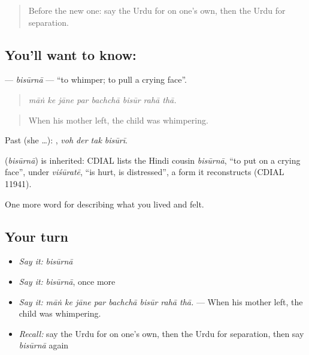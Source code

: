\label{lesson:UR-C450-bisurna}



\begin{quote}
Before the new one: say the Urdu for on one's own, then the Urdu for separation.
\end{quote}

\subsection*{You'll want to know: }
\textbf{} — \emph{bisūrnā} — \textquotedblleft{}to whimper; to pull a crying face\textquotedblright{}.

\begin{quote}
       
\end{quote}

\begin{quote}
\emph{māṅ ke jāne par bachchā bisūr rahā thā.}
\end{quote}

\begin{quote}
When his mother left, the child was whimpering.
\end{quote}

Past (she …):    , \emph{voh der tak bisūrī}.

\begin{cousinweb}
\textbf{} (\emph{bisūrnā}) is inherited: CDIAL lists the Hindi cousin \emph{bisūrnā}, \textquotedblleft{}to put on a crying face\textquotedblright{}, under \emph{viśūratē}, \textquotedblleft{}is hurt, is distressed\textquotedblright{}, a form it reconstructs (CDIAL 11941).
\end{cousinweb}

\begin{grammarlens}[title={What you've built}]
One more word for describing what you lived and felt.
\end{grammarlens}

\subsection*{Your turn}
\begin{itemize}
\raggedright
  \item \emph{Say it:} \emph{bisūrnā}
  \item \emph{Say it:} \emph{bisūrnā}, once more
  \item \emph{Say it:} \emph{māṅ ke jāne par bachchā bisūr rahā thā.} — When his mother left, the child was whimpering.
  \item \emph{Recall:} say the Urdu for on one's own, then the Urdu for separation, then say \emph{bisūrnā} again
\end{itemize}

